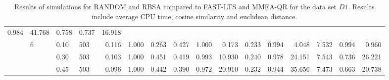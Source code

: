 \documentclass[thesis=B,english]{FITthesis}[2012/10/20]
\begin{document}
\begin{table}[h!]
\begin{adjustbox}{angle=90}
{\begin{tabular}{ll|l|l|r|r|r|r|r|r|r|r|r|r|r|r|}
 0.984 &  41.768 &  0.758 &  0.737 &  16.918 \\     & 6 & 0.10 & 503 &    0.116 &  1.000 &  0.263 &   0.427 &  1.000 &   0.173 &  0.233 &  0.994 &   4.048 &  7.532 &  0.994 &   0.960 \\     &   & 0.30 & 503 &    0.103 &  1.000 &  0.451 &   0.419 &  0.993 &  10.930 &  0.240 &  0.978 &  24.151 &  7.543 &  0.736 &  26.221 \\     &   & 0.45 & 503 &    0.096 &  1.000 &  0.442 &   0.390 &  0.972 &  20.910 &  0.232 &  0.944 &  35.656 &  7.473 &  0.663 &  20.738 \\
                         
                 \hline
                \end{tabular}
			}
			
\end{adjustbox}
    
    \caption{Results of simulations for RANDOM and RBSA  compared to FAST-LTS and MMEA-QR for the data set $D1$. Results include average CPU time, cosine similarity and euclidean distance.}
    \label{table:randim:1}
\end{table}
\end{document}
